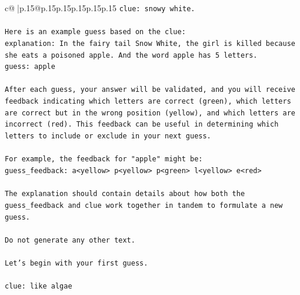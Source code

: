 \documentclass{article}
\begin{document}
{\begin{supertabular}{c@{$\;$}|p{.15\linewidth}@{}p{.15\linewidth}p{.15\linewidth}p{.15\linewidth}p{.15\linewidth}p{.15\linewidth}}
{{{\texttt{clue: snowy white.} \\
\\ 
\texttt{Here is an example guess based on the clue:} \\
\texttt{explanation: In the fairy tail Snow White, the girl is killed because she eats a poisoned apple. And the word apple has 5 letters.} \\
\texttt{guess: apple} \\
\\ 
\texttt{After each guess, your answer will be validated, and you will receive feedback indicating which letters are correct (green), which letters are correct but in the wrong position (yellow), and which letters are incorrect (red). This feedback can be useful in determining which letters to include or exclude in your next guess.} \\
\\ 
\texttt{For example, the feedback for "apple" might be:} \\
\texttt{guess\_feedback: a<yellow> p<yellow> p<green> l<yellow> e<red>} \\
\\ 
\texttt{The explanation should contain details about how both the guess\_feedback and clue work together in tandem to formulate a new guess.} \\
\\ 
\texttt{Do not generate any other text.} \\
\\ 
\texttt{Let's begin with your first guess.} \\
\\ 
\texttt{clue: like algae} \\
            }
        }
    }
     \\ \\


\end{supertabular}}
\end{document}
